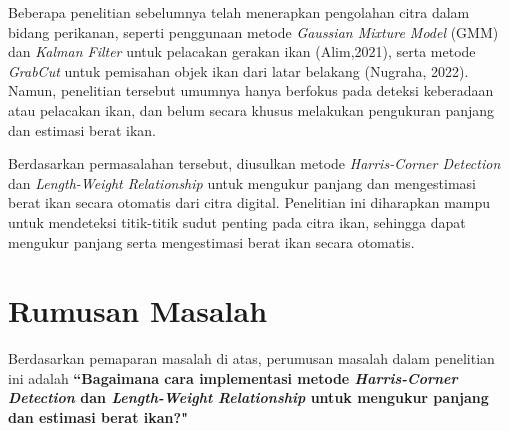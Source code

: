 Beberapa penelitian sebelumnya telah menerapkan pengolahan citra dalam bidang perikanan, seperti penggunaan metode \emph{Gaussian Mixture Model} (GMM) dan \emph{Kalman Filter} untuk pelacakan gerakan ikan (Alim,2021), 
serta metode \emph{GrabCut} untuk pemisahan objek ikan dari latar belakang (Nugraha, 2022). Namun, penelitian tersebut umumnya hanya berfokus pada deteksi keberadaan atau pelacakan ikan, dan belum secara khusus melakukan pengukuran panjang dan estimasi berat ikan.

Berdasarkan permasalahan tersebut, diusulkan metode \emph{Harris-Corner Detection} dan \emph{Length-Weight Relationship} untuk mengukur panjang dan mengestimasi berat ikan secara otomatis dari citra digital.
Penelitian ini diharapkan mampu untuk mendeteksi titik-titik sudut penting pada citra ikan, sehingga dapat mengukur panjang serta mengestimasi berat ikan secara otomatis.



\section{Rumusan Masalah}
Berdasarkan pemaparan masalah di atas, perumusan masalah dalam penelitian ini adalah \textbf{“Bagaimana cara implementasi metode \emph{Harris-Corner Detection} dan \emph{Length-Weight Relationship} untuk mengukur panjang dan estimasi berat ikan?"}%


